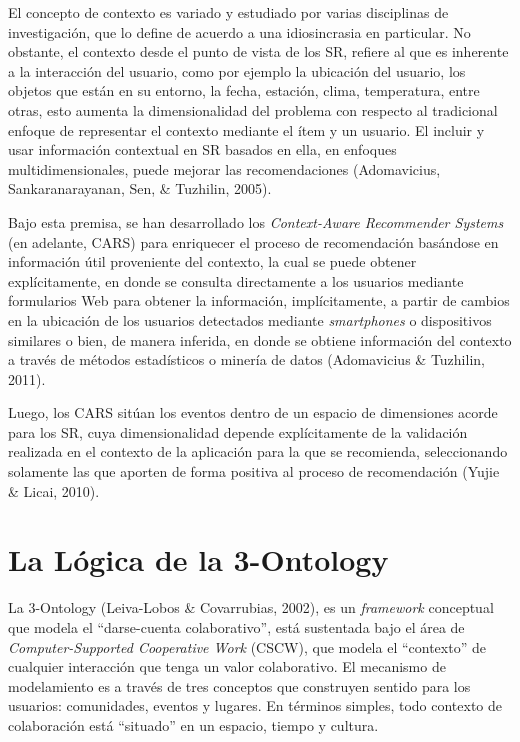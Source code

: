 El concepto de contexto es variado y estudiado por varias disciplinas de investigación, que lo define de acuerdo a una idiosincrasia en particular. No obstante, el contexto desde el punto de vista de los SR, refiere al que es inherente a la interacción del usuario, como por ejemplo la ubicación del usuario, los objetos que están en su entorno, la fecha, estación, clima, temperatura, entre otras, esto aumenta la dimensionalidad del problema con respecto al tradicional enfoque de representar el contexto mediante el ítem y un usuario. El incluir y usar información contextual en SR basados en ella, en enfoques multidimensionales, puede mejorar las recomendaciones (Adomavicius, Sankaranarayanan, Sen, & Tuzhilin, 2005).

Bajo esta premisa, se han desarrollado los \textit{Context-Aware Recommender Systems} (en adelante, CARS) para enriquecer el proceso de recomendación basándose en información útil proveniente del contexto, la cual se puede obtener explícitamente, en donde se consulta directamente a los usuarios mediante formularios Web para obtener la información, implícitamente, a partir de cambios en la ubicación de los usuarios detectados mediante \textit{smartphones} o dispositivos similares o bien, de manera inferida, en donde se obtiene información del contexto a través de métodos estadísticos o minería de datos (Adomavicius & Tuzhilin, 2011).

Luego, los CARS sitúan los eventos dentro de un espacio de dimensiones acorde para los SR, cuya dimensionalidad depende explícitamente de la validación realizada en el contexto de la aplicación para la que se recomienda, seleccionando solamente las que aporten de forma positiva al proceso de recomendación (Yujie & Licai, 2010).

\section{La L\'ogica de la 3-Ontology}

La 3-Ontology (Leiva-Lobos & Covarrubias, 2002), es un \textit{framework} conceptual que modela el “darse-cuenta colaborativo”, está sustentada bajo el área de \textit{Computer-Supported Cooperative Work} (CSCW), que modela el “contexto” de cualquier interacción que tenga un valor colaborativo. El mecanismo de modelamiento es a través de tres conceptos que construyen sentido para los usuarios: comunidades, eventos y lugares. En términos simples, todo contexto de colaboración está “situado” en un espacio, tiempo y cultura.

